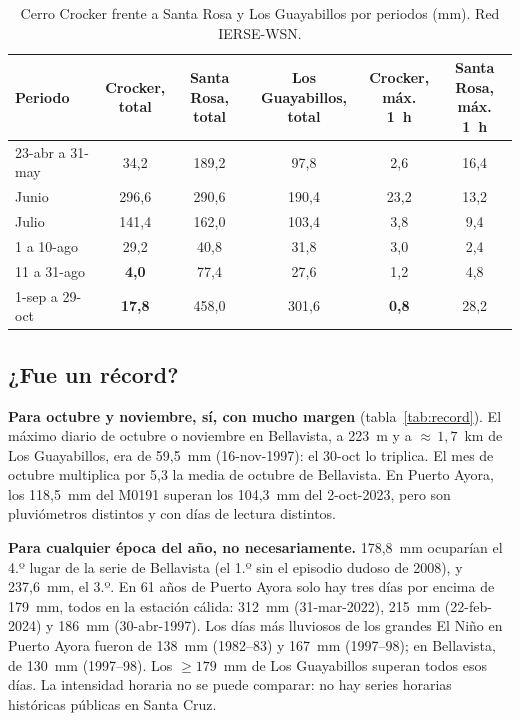 \documentclass{sosg-informe}
\begin{document}
\begin{table}[ht]
  \centering\small
  \caption{Cerro Crocker frente a Santa Rosa y Los Guayabillos por periodos (mm). Red IERSE-WSN.}
  \label{tab:crocker}
  \begin{tabular}{lccccc}
    \toprule
    Periodo & \makecell{Crocker,\\total} & \makecell{Santa Rosa,\\total} & \makecell{Los Guayabillos,\\total} & \makecell{Crocker,\\máx. 1~h} & \makecell{Santa Rosa,\\máx. 1~h} \\
    \midrule
    23-abr a 31-may & 34,2 & 189,2 & 97,8 & 2,6 & 16,4 \\
    Junio & 296,6 & 290,6 & 190,4 & 23,2 & 13,2 \\
    Julio & 141,4 & 162,0 & 103,4 & 3,8 & 9,4 \\
    1 a 10-ago & 29,2 & 40,8 & 31,8 & 3,0 & 2,4 \\
    11 a 31-ago & \textbf{4,0} & 77,4 & 27,6 & 1,2 & 4,8 \\
    1-sep a 29-oct & \textbf{17,8} & 458,0 & 301,6 & \textbf{0,8} & 28,2 \\
    \bottomrule
  \end{tabular}
\end{table}

\subsection{¿Fue un récord?}
\textbf{Para octubre y noviembre, sí, con mucho margen} (tabla~\ref{tab:record}). El máximo diario de octubre o noviembre en Bellavista, a 223~m y a ${\approx}\,1{,}7$~km de Los Guayabillos, era de 59,5~mm (16-nov-1997): el 30-oct lo triplica. El mes de octubre multiplica por 5,3 la media de octubre de Bellavista. En Puerto Ayora, los 118,5~mm del M0191 superan los 104,3~mm del 2-oct-2023, pero son pluviómetros distintos y con días de lectura distintos.

\textbf{Para cualquier época del año, no necesariamente.} 178,8~mm ocuparían el 4.º lugar de la serie de Bellavista (el 1.º sin el episodio dudoso de 2008), y 237,6~mm, el 3.º. En 61 años de Puerto Ayora solo hay tres días por encima de 179~mm, todos en la estación cálida: 312~mm (31-mar-2022), 215~mm (22-feb-2024) y 186~mm (30-abr-1997). Los días más lluviosos de los grandes El Niño en Puerto Ayora fueron de 138~mm (1982--83) y 167~mm (1997--98); en Bellavista, de 130~mm (1997--98). Los $\geq 179$~mm de Los Guayabillos superan todos esos días. La intensidad horaria no se puede comparar: no hay series horarias históricas públicas en Santa Cruz.
\end{document}
